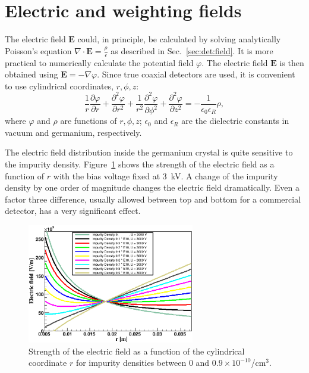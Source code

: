  
\section{Electric and weighting fields} 
\label{sec:pss:field} 
The electric field $\mathbf{E}$ could, in principle, be calculated by
solving analytically Poisson's equation $\nabla \cdot \mathbf{E} =
\frac{\rho}{\epsilon}$ as described in Sec.~\ref{sec:det:field}. It is
more practical to numerically calculate the potential field
$\varphi$. The electric field $\mathbf{E}$ is then obtained using
$\mathbf{E} = - \nabla \varphi$. Since true coaxial detectors are
used, it is convenient to use cylindrical coordinates, $r, \phi, z$:
\begin{equation} 
\frac{1}{r} \frac{\partial \varphi}{\partial r} + \frac{\partial^{2} \varphi}{\partial r^{2}} + \frac{1}{r^{2}} \frac{\partial^{2} \varphi}{\partial \phi^{2}} + 
\frac{\partial^{2} \varphi}{\partial z^{2}} = - \frac{1}{\epsilon_{0} 
\epsilon_{R}} \rho, 
\label{eq:pss:pocyl} 
\end{equation} 
where $\varphi$ and $\rho$ are functions of $r, \phi, z$;
$\epsilon_{0}$ and $\epsilon_{R}$ are the dielectric constants in
vacuum and germanium, respectively.
 
The electric field distribution inside the germanium crystal is quite
sensitive to the impurity density. Figure~\ref{fig:pss:rho} shows the
strength of the electric field as a function of $r$ with the bias
voltage fixed at 3~kV.  A change of the impurity density by one order
of magnitude changes the electric field dramatically. Even a factor
three difference, usually allowed between top and bottom for a
commercial detector, has a very significant effect.

 
\begin{figure}[htbp] 
\centering 
\includegraphics[width=0.65\textwidth]{rho} 
\caption{Strength of the electric field as a function of the
cylindrical coordinate $r$ for impurity densities between 0 and $0.9
\times 10^{-10}$/cm$^{3}$.}
\label{fig:pss:rho} 
\end{figure} 
 
